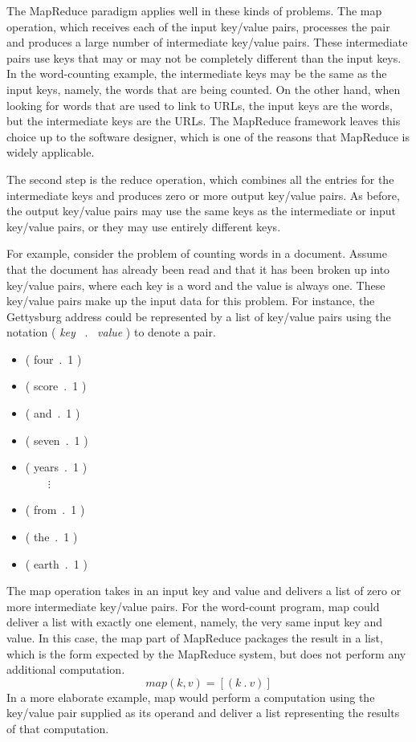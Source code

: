 The MapReduce paradigm applies well in these kinds of problems.
The \textsf{map} operation, which receives each
of the input key/value pairs, processes the
pair and produces a large number of intermediate
key/value pairs.  These intermediate pairs use keys that may
or may not be completely different than the input keys.
In the word-counting example, the intermediate keys may be the same
as the input keys, namely, the words that are being counted.
On the other hand, when looking for words that are used to
link to URLs, the input keys are the words, but the
intermediate keys are the URLs. The MapReduce framework leaves
this choice up to the software designer, which is
one of the reasons that MapReduce is widely applicable.

The second step is the \textsf{reduce}
operation, which combines all the entries
for the intermediate keys and
produces zero or more output key/value pairs.  As before, the
output key/value pairs may use the same keys as the
intermediate or input key/value pairs, or they may use
entirely different keys.

For example, consider the problem of counting words in a
document.  Assume that the document has already been
read and that it has been broken up into key/value pairs,
where each key is a word and the value is always one. These
key/value pairs make up the input data for this problem. For
instance, the Gettysburg address could be represented by a
list of key/value pairs using the notation ( \emph{key} ~.~ \emph{value} )
to denote a pair.
\begin{itemize}
\item \textsf{( four~.~1 )}
\item \textsf{( score~.~1 )}
\item \textsf{( and~.~1 )}
\item \textsf{( seven~.~1 )}
\item \textsf{( years~.~1 )}\\~~~~$\vdots$
\item \textsf{( from~.~1 )}
\item \textsf{( the~.~1 )}
\item \textsf{( earth~.~1 )}
\end{itemize}

The \textsf{map} operation takes in an input key and
value and delivers a list of zero or more intermediate
key/value pairs.  For the word-count program, map could
deliver a list with exactly one element, namely,
the very same input key and value.
In this case, the map part of MapReduce
packages the result in a list, which is
the form expected by the MapReduce system,
but does not perform any additional computation.
\begin{displaymath}
map(k, v) = [ ( k ~.~ v ) ]
\end{displaymath}
In a more elaborate example, map would perform
a computation using the key/value pair supplied as
its operand and deliver a list representing the results
of that computation.

